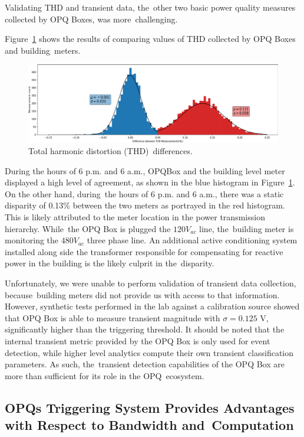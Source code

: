 \documentclass[energies,article,accept,moreauthors,pdftex]{Definitions/mdpi}
\begin{document}
Validating THD and transient data, the~other two basic power quality measures collected by OPQ Boxes, was more~challenging.

Figure~\ref{fig:opqbox-thd-validation} shows the results of comparing values of THD collected by OPQ Boxes and building~meters.

\begin{figure}[H]
\centering
\includegraphics[width=0.8\linewidth]{images/pilot/opqbox-thd-validation.png}
\caption{Total harmonic distortion (THD)~differences.}
\label{fig:opqbox-thd-validation}
\end{figure}

During the hours of 6 p.m. and 6 a.m., OPQBox and the building level meter displayed a high level of agreement, as shown in the blue histogram in Figure~\ref{fig:opqbox-thd-validation}.
On the other hand, during~the hours of 6 p.m. and 6 a.m., there was a static disparity of 0.13\% between the two meters as portrayed in the red histogram.
This is likely attributed to the meter location in the power transmission hierarchy.
While~the OPQ Box is plugged the $120V_{ac}$ line, the~building meter is monitoring the $480V_{ac}$ three phase line.
An additional active conditioning system installed along side the transformer responsible for compensating for reactive power in the building is the likely culprit in the~disparity.

Unfortunately, we were unable to perform validation of transient data collection, because~building meters did not provide us with access to that information.
However, synthetic tests performed in the lab against a calibration source showed that OPQ Box is able to measure transient magnitude with $\sigma=0.125$ V, significantly higher than the triggering threshold.
It should be noted that the internal transient metric provided by the OPQ Box is only used for event detection, while higher level analytics compute their own transient classification parameters.
As such, the~transient detection capabilities of the OPQ Box are more than sufficient for its role in the OPQ~ecosystem.

\subsection{OPQs Triggering System Provides Advantages with Respect to Bandwidth and~Computation}
\label{hyp:02}
\end{document}

